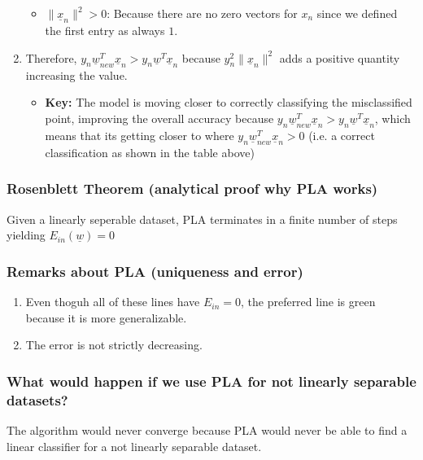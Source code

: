 \begin{intuition}
\begin{enumerate}
\begin{itemize}
                \item $\lVert \underline{x}_n \rVert^2 > 0$: Because there are no zero vectors for $x_n$ since we defined the first entry as always $1$. 
            \end{itemize}
            \item Therefore, $ y_n \underline{w}_{new}^T \underline{x}_n > y_n \underline{w}^T \underline{x}_n$ because $y_n^2 \lVert \underline{x}_n \rVert^2$ adds a positive quantity increasing the value. 
            \begin{itemize}
                \item \textbf{Key:} The model is moving closer to correctly classifying the misclassified point, improving the overall accuracy because $y_n \underline{w}_{new}^T \underline{x}_n > y_n \underline{w}^T \underline{x}_n$, which means that its getting closer to where $y_n \underline{w}_{new}^T \underline{x}_n > 0$ (i.e. a correct classification as shown in the table above)
            \end{itemize}
        \end{enumerate}
    \end{intuition}

    \subsubsection{Rosenblett Theorem (analytical proof why PLA works)}
    \begin{theorem}
        Given a linearly seperable dataset, PLA terminates in a finite number of steps yielding $E_{in} (\underline{w}) = 0$
    \end{theorem}

    \subsubsection{Remarks about PLA (uniqueness and error)}
    \begin{intuition}
        \begin{enumerate}
            \item Even thoguh all of these lines have $E_{in} = 0$, the preferred line is green because it is more generalizable.
            \item The error is not strictly decreasing.
        \end{enumerate}
    \end{intuition}

    \subsubsection{What would happen if we use PLA for not linearly separable datasets?}
    \begin{intuition}
        The algorithm would never converge because PLA would never be able to find a linear classifier for a not linearly separable dataset.
    \end{intuition}

